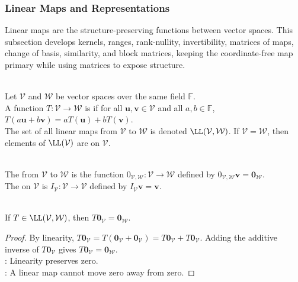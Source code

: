 \subsubsection{Linear Maps and Representations}

Linear maps are the structure-preserving functions between vector spaces. This subsection develops kernels, ranges, rank-nullity, invertibility, matrices of maps, change of basis, similarity, and block matrices, keeping the coordinate-free map primary while using matrices to expose structure.

\begin{definition} \\
Let $\mathcal{V}$ and $\mathcal{W}$ be vector spaces over the same field $\mathbb{F}$.\\
A function $T : \mathcal{V} \to \mathcal{W}$ is  if for all $\mathbf{u}, \mathbf{v} \in \mathcal{V}$ and all $a,b \in \mathbb{F}$, $T(a\mathbf{u} + b\mathbf{v}) = aT(\mathbf{u}) + bT(\mathbf{v})$.\\
The set of all linear maps from $\mathcal{V}$ to $\mathcal{W}$ is denoted $\LL(\mathcal{V}, \mathcal{W})$. If $\mathcal{V} = \mathcal{W}$, then elements of $\LL(\mathcal{V})$ are  on $\mathcal{V}$.
\end{definition}

\begin{definition} \\
The  from $\mathcal{V}$ to $\mathcal{W}$ is the function $0_{\mathcal{V},\mathcal{W}}:\mathcal{V}\to\mathcal{W}$ defined by $0_{\mathcal{V},\mathcal{W}}\mathbf{v}=\mathbf{0}_{\mathcal{W}}$.\\
The  on $\mathcal{V}$ is $I_{\mathcal{V}}:\mathcal{V}\to\mathcal{V}$ defined by $I_{\mathcal{V}}\mathbf{v}=\mathbf{v}$.
\end{definition}

\begin{proposition} \label{prop:linear-maps-send-zero-to-zero} \\
If $T\in\LL(\mathcal{V},\mathcal{W})$, then $T\mathbf{0}_{\mathcal{V}}=\mathbf{0}_{\mathcal{W}}$.
\begin{proof}
By linearity, $T\mathbf{0}_{\mathcal{V}}=T(\mathbf{0}_{\mathcal{V}}+\mathbf{0}_{\mathcal{V}})=T\mathbf{0}_{\mathcal{V}}+T\mathbf{0}_{\mathcal{V}}$. Adding the additive inverse of $T\mathbf{0}_{\mathcal{V}}$ gives $T\mathbf{0}_{\mathcal{V}}=\mathbf{0}_{\mathcal{W}}$.\\
: Linearity preserves zero.\\
: A linear map cannot move zero away from zero.
\end{proof}
\end{proposition}

